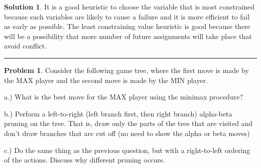 \documentclass{article}
\theoremstyle{definition}
\newtheorem{problem}{Problem}
\def\fline{\rule{0.75\linewidth}{0.5pt}}
\newcommand{\finishline}{\begin{center}\fline\end{center}}
\newtheorem*{solution*}{Solution}
\newenvironment{solution}{\begin{solution*}}{{\finishline} \end{solution*}}
\begin{document}
\begin{solution}
	\item It is a good heuristic to choose the variable that is most constrained because such variables are likely to cause a failure and it is more efficient to fail as early as possible. The least constraining value heuristic is good because there will be a possibility that more number of future assignments will take place that avoid conflict.  

\end{solution}

\begin{problem} %
	\item Consider the following game tree, where the first move is made by the MAX player and the second move is made by the MIN player.
		\item a.) What is the best move for the MAX player using the minimax procedure?
		\item b.) Perform a left-to-right (left branch first, then right branch) alpha-beta pruning on the tree. That is, draw only the parts of the tree that are visited and don't draw branches that are cut off (no need to show the alpha or beta moves)
		\item c.) Do the same thing as the previous question, but with a right-to-left ordering of the actions. Discuss why different pruning occurs.

\end{problem}

\begin{newpage}
\end{newpage}
\end{document}
